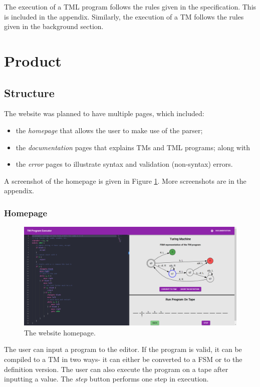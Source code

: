 The execution of a TML program follows the rules given in the specification. This is included in the appendix. Similarly, the execution of a TM follows the rules given in the background section.

\section{Product}
\subsection{Structure}
The website was planned to have multiple pages, which included:
\begin{itemize}
    \item the \emph{homepage} that allows the user to make use of the parser;
    \item the \emph{documentation} pages that explains TMs and TML programs; along with
    \item the \emph{error} pages to illustrate syntax and validation (non-syntax) errors.
\end{itemize}

A screenshot of the homepage is given in Figure \ref{fig:homepage_design}. More screenshots are in the appendix.

\subsubsection{Homepage}
\begin{figure}[htb]
    \centering
    \includegraphics[scale=0.18]{images/Homepage execution start.png}
    \caption{The website homepage.}
    \label{fig:homepage_design}
\end{figure}

The user can input a program to the editor. If the program is valid, it can be compiled to a TM in two ways- it can either be converted to a FSM or to the definition version. The user can also execute the program on a tape after inputting a value. The \emph{step} button performs one step in execution. 

